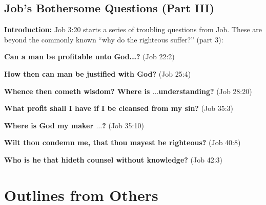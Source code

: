 \subsection{Job's Bothersome Questions (Part III)}
\textbf{Introduction:} Job 3:20 starts a series of troubling questions from Job. These are beyond the commonly known ``why do the righteous suffer?'' (part 3):%
\begin{compactenum}[I.][7]
    \item  \textbf{Can a man be profitable unto God...?} (Job 22:2)
    \item  \textbf{How then can man be justified with God?} (Job 25:4)
    \item  \textbf{Whence then cometh wisdom? Where is $\hdots$understanding?} (Job 28:20)
    \item  \textbf{What profit shall I have if I be cleansed from my sin?} (Job 35:3)
    \item  \textbf{Where is God my maker $\hdots$?} (Job 35:10)
    \item  \textbf{Wilt thou condemn me, that thou mayest be righteous?} (Job 40:8)
    \item  \textbf{Who is he that hideth counsel without knowledge?} (Job 42:3)
\end{compactenum}
\section{Outlines from Others}


\newpage